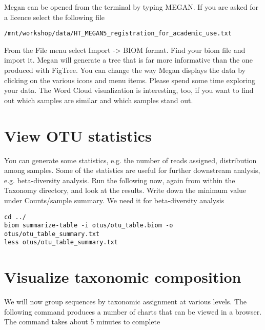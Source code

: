 \begin{steps}
Megan can be opened from the terminal by typing MEGAN. If you are asked for a licence select the following file 
\begin{lstlisting}
/mnt/workshop/data/HT_MEGAN5_registration_for_academic_use.txt 
\end{lstlisting}
\end{steps}

\begin{note}
From the File menu select Import -> BIOM format. Find your biom file and import it. Megan will generate a tree that is far more informative than the one produced with FigTree. You can change the way Megan displays the data by clicking on the various icons and menu items. Please spend some time exploring your data. The Word Cloud visualization is interesting, too, if you want to find out which samples are similar and which samples stand out.
\end{note}

\section{View OTU statistics}

\begin{information}
You can generate some statistics, e.g. the number of reads assigned, distribution among samples. Some of the statistics are useful for further downstream analysis, e.g. beta-diversity analysis. Run the following now, again from within the Taxonomy directory, and look at the results. Write down the minimum value under Counts/sample summary. We need it for beta-diversity analysis
\end{information}

\begin{steps}
\begin{lstlisting}
cd ../
biom summarize-table -i otus/otu_table.biom -o otus/otu_table_summary.txt
less otus/otu_table_summary.txt
\end{lstlisting}
\end{steps}

\section{Visualize taxonomic composition}
We will now group sequences by taxonomic assignment at various levels. The following command produces a number of charts that can be viewed in a browser. The command takes about 5 minutes to complete


